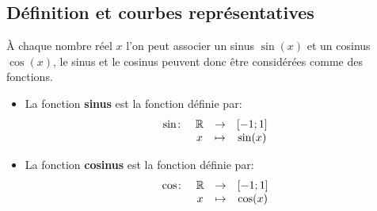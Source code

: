\documentclass{poly}
\begin{document}
\subsection{Définition et courbes représentatives}
À chaque nombre réel $x$ l'on peut associer un sinus $\sin(x)$ et un cosinus $\cos(x)$, le sinus et le cosinus peuvent donc être considérées comme des fonctions.
\begin{definition}
\hfill
\begin{itemize}
\item La fonction \textbf{sinus} est la fonction définie par:
\begin{equation*}
\begin{array}[t]{lccc} \sin \colon &\mathbb{R} &\to& [-1;1]\\ & x &\mapsto& \sin(x)\end{array}
\end{equation*} 
\item La fonction \textbf{cosinus} est la fonction définie par:
\begin{equation*}
\begin{array}[t]{lccc} \cos \colon &\mathbb{R} &\to& [-1;1]\\ & x &\mapsto& \cos(x)\end{array}
\end{equation*} 
\end{itemize}
\end{definition}
\end{document}
